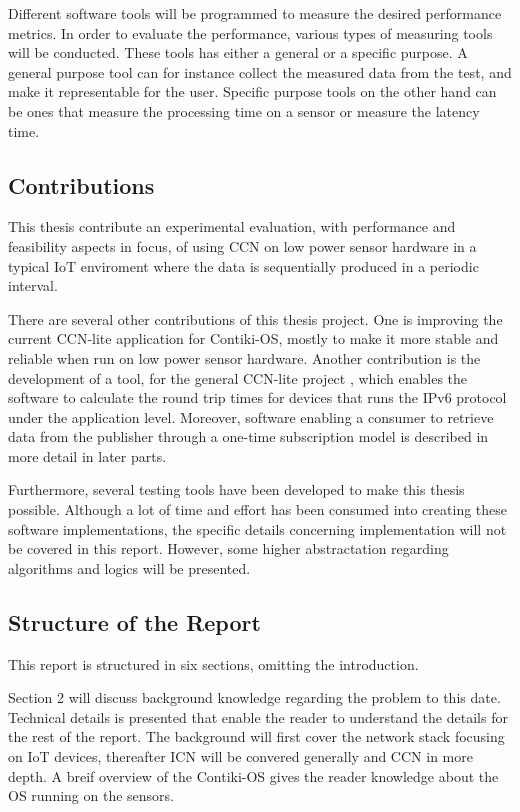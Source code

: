Different software tools will be programmed to measure the desired performance metrics. 
In order to evaluate the performance, various types of measuring tools will be conducted. These tools has either a general or a specific purpose. A general purpose tool can for instance collect the measured data from the test, and make it representable for the user. Specific purpose tools on the other hand can be ones that measure the processing time on a sensor or measure the latency time. 

\subsection{Contributions}

This thesis contribute an experimental evaluation, with performance and feasibility aspects in focus, of using CCN on low power sensor hardware in a typical IoT enviroment where the data is sequentially produced in a periodic interval.

There are several other contributions of this thesis project. One is improving the current CCN-lite application for Contiki-OS, mostly to make it more stable and reliable when run on low power sensor hardware. Another contribution is the development of a tool, for the general CCN-lite project \cite{CCN-lite}, which enables the software to calculate the round trip times for devices that runs the IPv6 protocol under the application level. Moreover, software enabling a consumer to retrieve data from the publisher through a one-time subscription model is described in more detail in later parts.

Furthermore, several testing tools have been developed to make this thesis possible. Although a lot of time and effort has been consumed into creating these software implementations, the specific details concerning implementation will not be covered in this report. However, some higher abstractation regarding algorithms and logics will be presented.




\subsection{Structure of the Report}
This report is structured in six sections, omitting the introduction.

Section 2 will discuss background knowledge regarding the problem to this date. Technical details is presented that enable the reader to understand the details for the rest of the report. The background will first cover the network stack focusing on IoT devices, thereafter ICN will be convered generally and CCN in more depth. A breif overview of the Contiki-OS gives the reader knowledge about the OS running on the sensors.

